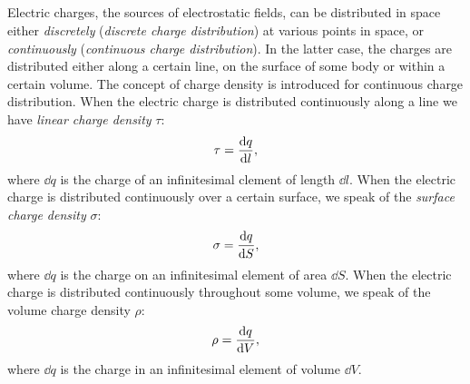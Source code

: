 \subsection{}\label{15.2.3} Electric charges, the sources of electrostatic fields, can be distributed in space either \emph{discretely} (\emph{discrete charge distribution}) at various points in space, or \emph{continuously} (\emph{continuous charge distribution}). In the latter case, the charges are distributed either along a certain line, on the surface of some body or within a certain volume. The concept of charge density is introduced for continuous charge distribution. When the electric charge is distributed continuously along a line we have \emph{linear charge density} $\tau$:
\begin{equation*}%
\tau = \dv{q}{l},
\end{equation*}
where $\dd q$ is the charge of an infinitesimal clement of length $\dd l$. When the electric charge is distributed continuously over a certain surface, we speak of the \emph{surface charge density} $\sigma$:
\begin{equation*}%
\sigma = \dv{q}{S},
\end{equation*}
where $\dd q$ is the charge on an infinitesimal element of area $\dd S$. When the electric charge is distributed continuously throughout some volume, we speak of the volume charge density $\rho$:
\begin{equation*}%
\rho = \dv{q}{V},
\end{equation*}
where $\dd q$ is the charge in an infinitesimal element of volume $\dd V$.

